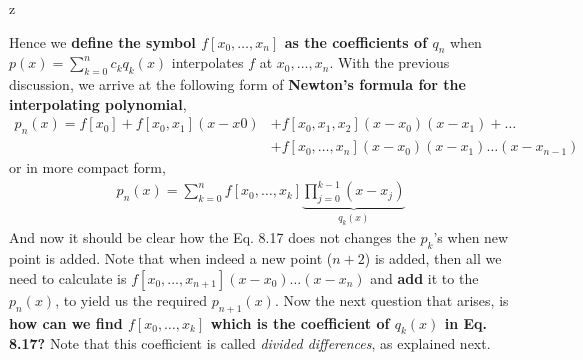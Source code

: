 z\documentclass[a4paper,12pt,twoside]{book}
\newcommand{\nll}[0]{\newline\newline}
\newcommand{\tit}[1]{\textit{#1}}
\begin{document}
Hence we \textbf{define the symbol $f[x_0,\dots,x_n]$ as the coefficients of $q_n$} when $p(x) = \sum_{k=0}^{n}c_k q_k(x)$ interpolates $f$ at $x_0,\dots,x_n$.
\nll
With the previous discussion, we arrive at the following form of \textbf{Newton's formula for the interpolating polynomial},
\begin{equation}
    \begin{split}
        p_n(x) = f[x_0] + f[x_0,x_1](x-x0) &+ f[x_0,x_1,x_2](x-x_0)(x-x_1) + \dots \\
        &+f[x_0,\dots,x_n](x-x_0)(x-x_1)\dots(x-x_{n-1})
    \end{split}
\end{equation}
or in more compact form,
\begin{equation}
    \begin{split}
        \boxed{p_n(x) = \sum_{k=0}^{n} f[x_0,\dots,x_k] \underbrace{\prod_{j=0}^{k-1} (x-x_j)}_{q_k(x)} }
    \end{split}
\end{equation}
And now it should be clear how the Eq. 8.17 does not changes the $p_k$'s when new point is added. Note that when indeed a new point ($n+2$) is added, then all we need to calculate is $f[x_0,\dots,x_{n+1}](x-x_0)\dots(x-x_n)$ and \textbf{add} it to the $p_n(x)$, to yield us the required $p_{n+1}(x)$.
\nll
Now the next question that arises, is \textbf{how can we find $f[x_0,\dots,x_k]$ which is the coefficient of $q_k(x)$ in Eq. 8.17?} Note that this coefficient is called \tit{divided differences}, as explained next.
\end{document}
